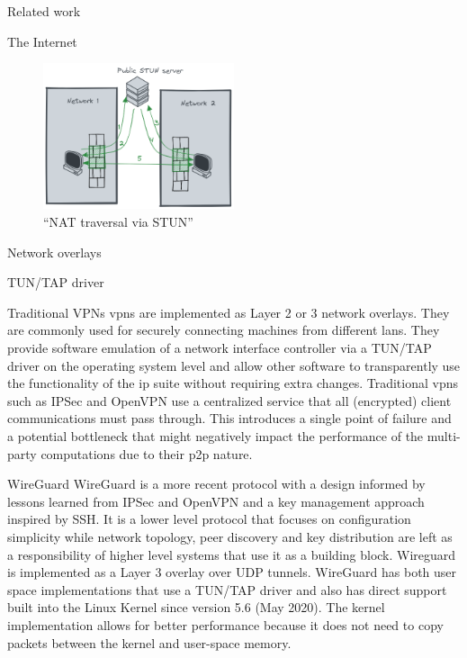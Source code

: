 \begin{frame}[fragile]{Related work}
\begin{block}{The Internet}
\begin{figure}
\centering
\includegraphics[width=0.5\textwidth,height=0.25\textheight]{thesis/../figures/nat-traversal.png}
\caption{``NAT traversal via STUN''\label{nat-traversal}}
\end{figure}
\end{block}

\begin{block}{Network overlays}
\protect\hypertarget{network-overlays}{}
\begin{block}{TUN/TAP driver}
\protect\hypertarget{tuntap-driver}{}
\end{block}

\begin{block}{Traditional VPNs}
\protect\hypertarget{traditional-vpns}{}
\glspl{vpn} are implemented as Layer 2 or 3 network overlays. They are
commonly used for securely connecting machines from different
\glspl{lan}. They provide software emulation of a network interface
controller via a TUN/TAP driver on the operating system level and allow
other software to transparently use the functionality of the \gls{ip}
suite without requiring extra changes. Traditional \glspl{vpn} such as
IPSec\autocite{ipSecDocs} and OpenVPN\autocite{openVPNDocs} use a
centralized service that all (encrypted) client communications must pass
through. This introduces a single point of failure and a potential
bottleneck that might negatively impact the performance of the
multi-party computations due to their \gls{p2p} nature.
\end{block}

\begin{block}{WireGuard}
\protect\hypertarget{wireguard}{}
WireGuard\autocite{donenfeldWireGuardNextGeneration2017} is a more
recent protocol with a design informed by lessons learned from IPSec and
OpenVPN and a key management approach inspired by SSH. It is a lower
level protocol that focuses on configuration simplicity while network
topology, peer discovery and key distribution are left as a
responsibility of higher level systems that use it as a building block.
Wireguard is implemented as a Layer 3 overlay over UDP tunnels.
WireGuard has both user space implementations that use a TUN/TAP driver
and also has direct support built into the Linux Kernel since version
5.6 (May 2020). The kernel implementation allows for better performance
because it does not need to copy packets between the kernel and
user-space memory.


\end{block}
\end{block}
\end{frame}
